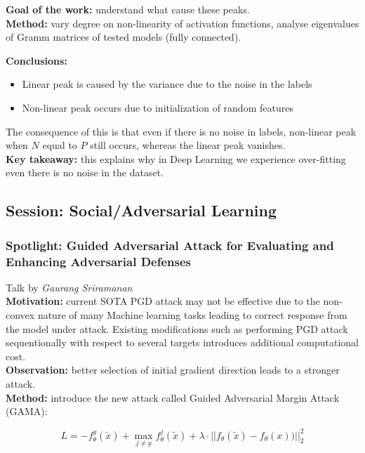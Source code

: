 {\bf Goal of the work:} understand what cause these peaks. \\

{\bf Method:} vary degree on non-linearity of activation functions, analyse eigenvalues of Gramm matrices of tested models (fully connected).

{\bf Conclusions:} 
\begin{itemize}
  \item Linear peak is caused by the variance due to the noise in the labels
  \item Non-linear peak occurs due to initialization of random features
\end{itemize}
The consequence of this is that even if there is no noise in labels, non-linear peak when $N$ equal to $P$ still occurs, whereas the linear peak vanishes. \\

{\bf Key takeaway:} this explains why in Deep Learning we experience over-fitting even there is no noise in the dataset. \\



\subsection{Session: Social/Adversarial Learning}
\subsubsection{Spotlight: Guided Adversarial Attack for Evaluating and Enhancing Adversarial Defenses \cite{SriramananABR20}}

Talk by \textit{Gaurang Sriramanan} \\

{\bf Motivation:} current SOTA PGD attack may not be effective due to the non-convex nature of many Machine learning tasks leading to correct response from the model under attack. Existing modifications such as performing PGD attack sequentionally with respect to several targets introduces additional computational cost. \\

{\bf Observation:} better selection of initial gradient direction leads to a stronger attack. \\

{\bf Method:} introduce the new attack called Guided Adversarial Margin Attack (GAMA):

\begin{equation}
    L = -f^{y}_{\theta}(\tilde{x}) + \max_{j \neq y} f^{j}_{\theta}(\tilde{x}) + \lambda \cdot ||f_{\theta}(\tilde{x}) - f_{\theta}(x))||^2_2 
    \label{eq:gama}
\end{equation}

